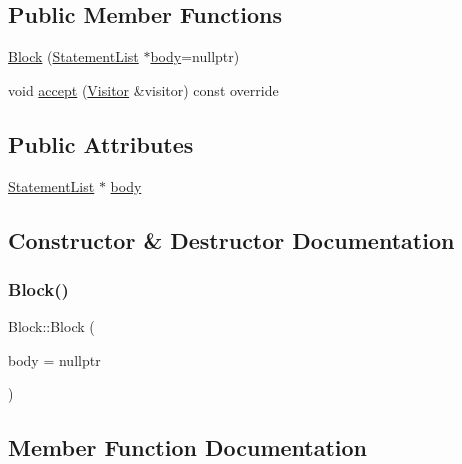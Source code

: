 \subsection*{Public Member Functions}
\begin{DoxyCompactItemize}
\item 
\hyperlink{struct_block_a757d46b60b5babb84c5c466b99679c2d}{Block} (\hyperlink{struct_statement_list}{Statement\+List} $\ast$\hyperlink{struct_block_a05207097167e9263252079d78f3d9358}{body}=nullptr)
\item 
void \hyperlink{struct_block_ac00e5c0ee8486dbdc7cb91dd5a6b34e1}{accept} (\hyperlink{struct_visitor}{Visitor} \&visitor) const override
\end{DoxyCompactItemize}
\subsection*{Public Attributes}
\begin{DoxyCompactItemize}
\item 
\hyperlink{struct_statement_list}{Statement\+List} $\ast$ \hyperlink{struct_block_a05207097167e9263252079d78f3d9358}{body}
\end{DoxyCompactItemize}


\subsection{Constructor \& Destructor Documentation}
\mbox{\label{struct_block_a757d46b60b5babb84c5c466b99679c2d}} 
\subsubsection{\texorpdfstring{Block()}{Block()}}
{\footnotesize\ttfamily Block\+::\+Block (\begin{DoxyParamCaption}\item[{\hyperlink{struct_statement_list}{Statement\+List} $\ast$}]{body = {\ttfamily nullptr} }\end{DoxyParamCaption})\hspace{0.3cm}{\ttfamily [inline]}}



\subsection{Member Function Documentation}
\mbox{\label{struct_block_ac00e5c0ee8486dbdc7cb91dd5a6b34e1}} 
